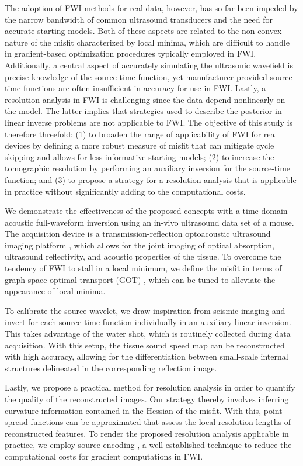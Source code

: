 \documentclass[12pt]{iopart}
\begin{document}
The adoption of FWI methods for real data, however, has so far been impeded by the narrow bandwidth of common ultrasound transducers and the need for accurate starting models. Both of these aspects are related to the non-convex nature of the misfit characterized by local minima, which are difficult to handle in gradient-based optimization procedures typically employed in FWI. Additionally, a central aspect of accurately simulating the ultrasonic wavefield is precise knowledge of the source-time function, yet manufacturer-provided source-time functions are often insufficient in accuracy for use in FWI. Lastly, a resolution analysis in FWI is challenging since the data depend nonlinearly on the model. The latter implies that strategies used to describe the posterior in linear inverse problems are not applicable to FWI. The objective of this study is therefore threefold: (1) to broaden the range of applicability of FWI for real devices by defining a more robust measure of misfit that can mitigate cycle skipping and allows for less informative starting models; (2) to increase the tomographic resolution by performing an auxiliary inversion for the source-time function; and (3) to propose a strategy for a resolution analysis that is applicable in practice without significantly adding to the computational costs.    

We demonstrate the effectiveness of the proposed concepts with a time-domain acoustic full-waveform inversion using an in-vivo ultrasound data set of a mouse. The acquisition device is a transmission-reflection optoacoustic ultrasound imaging platform \cite{lafci_IEEE_TUFFC}, which allows for the joint imaging of optical absorption, ultrasound reflectivity, and acoustic properties of the tissue. To overcome the tendency of FWI to stall in a local minimum, we define the misfit in terms of graph-space optimal transport (GOT) \cite{Metevier_GOT_2019}, which can be tuned to alleviate the appearance of local minima. 

To calibrate the source wavelet, we draw inspiration from seismic imaging \cite{Groos_2014} and invert for each source-time function individually in an auxiliary linear inversion. This takes advantage of the water shot, which is routinely collected during data acquisition. With this setup, the tissue sound speed map can be reconstructed with high accuracy, allowing for the differentiation between small-scale internal structures delineated in the corresponding reflection image.   

Lastly, we propose a practical method for resolution analysis in order to quantify the quality of the reconstructed images. Our strategy thereby involves inferring curvature information contained in the Hessian of the misfit. With this, point-spread functions can be approximated that assess the local resolution lengths of reconstructed features. To render the proposed resolution analysis applicable in practice, we employ source encoding \cite{Capdeville_2005,Krebs_2009,Wang_2015}, a well-established technique to reduce the computational costs for gradient computations in FWI. 
\end{document}
